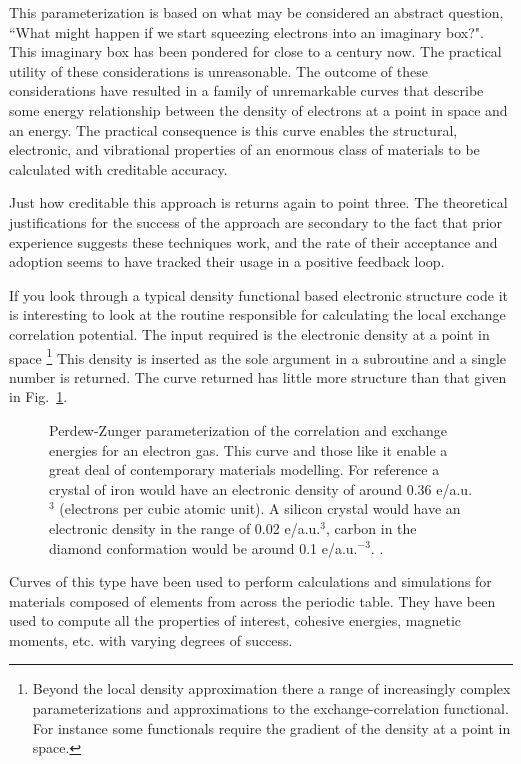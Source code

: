 This parameterization is based on what may be considered an abstract question,
``What might happen if we start squeezing electrons into an imaginary box?".
This imaginary box has been pondered for close to a century now. 
The practical utility of these considerations is unreasonable. 
The outcome of these considerations have resulted in a family of 
unremarkable curves that describe some energy relationship between
the density of electrons at a point in space and an energy. 
The practical consequence is this curve enables the
structural, electronic, and vibrational properties of an 
enormous class of materials to be calculated with creditable accuracy.

Just how creditable this approach is returns again to point three. 
The theoretical justifications for the success of the approach are
secondary to the fact that prior experience suggests these techniques work, 
and the rate of their acceptance and adoption seems to have 
tracked their usage in a positive feedback loop. 

If you look through a typical density functional based electronic structure code it is interesting to look at the routine
responsible for calculating the local exchange correlation potential. The input required is the 
electronic density at a point in space \footnote{Beyond the local density
approximation there a range of increasingly complex parameterizations and
approximations to the exchange-correlation functional. For instance some functionals
require the gradient of the density at a point in space.} This 
density is inserted as the sole argument in a subroutine and a single number is returned. The curve
returned has little more structure than that given in Fig.~\ref{fig:ldapz}. 
%
\begin{figure}
\begin{center}
\graphicspath{{./intro/}}
\caption{Perdew-Zunger parameterization of the correlation and exchange energies for an electron gas.
This curve and those like it enable a great deal of contemporary materials modelling. For reference
a crystal of iron would have an electronic density of around 0.36 e/a.u.$^{3}$ (electrons per cubic
atomic unit). A silicon crystal would have an electronic density in the range of 0.02 e/a.u.$^{3}$,
carbon in the diamond conformation would be around 0.1 e/a.u.$^{-3}$.  
\label{fig:ldapz}.}
\end{center}
\end{figure}
%
Curves of this type have been used to perform calculations and simulations for 
materials composed of elements from across the periodic table. They have been
used to compute all the properties of interest, cohesive energies, magnetic moments,
etc. with varying degrees of success.

